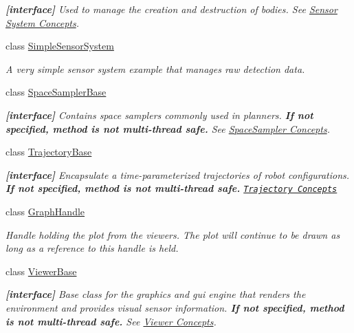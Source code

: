 \begin{DoxyCompactItemize}
\begin{DoxyCompactList}\small\item\em {\bfseries \mbox{[}interface\mbox{]}} Used to manage the creation and destruction of bodies. See \hyperlink{arch__sensorsystem}{Sensor System Concepts}. \item\end{DoxyCompactList}\item 
class \hyperlink{classOpenRAVE_1_1SimpleSensorSystem}{SimpleSensorSystem}
\begin{DoxyCompactList}\small\item\em A very simple sensor system example that manages raw detection data. \item\end{DoxyCompactList}\item 
class \hyperlink{classOpenRAVE_1_1SpaceSamplerBase}{SpaceSamplerBase}
\begin{DoxyCompactList}\small\item\em {\bfseries \mbox{[}interface\mbox{]}} Contains space samplers commonly used in planners. {\bfseries If not specified, method is not multi-\/thread safe.} See \hyperlink{arch__spacesampler}{SpaceSampler Concepts}. \item\end{DoxyCompactList}\item 
class \hyperlink{classOpenRAVE_1_1TrajectoryBase}{TrajectoryBase}
\begin{DoxyCompactList}\small\item\em {\bfseries \mbox{[}interface\mbox{]}} Encapsulate a time-\/parameterized trajectories of robot configurations. {\bfseries If not specified, method is not multi-\/thread safe.} \href{../main/architecture/trajectory.html}{\tt Trajectory Concepts} \item\end{DoxyCompactList}\item 
class \hyperlink{classOpenRAVE_1_1GraphHandle}{GraphHandle}
\begin{DoxyCompactList}\small\item\em Handle holding the plot from the viewers. The plot will continue to be drawn as long as a reference to this handle is held. \item\end{DoxyCompactList}\item 
class \hyperlink{classOpenRAVE_1_1ViewerBase}{ViewerBase}
\begin{DoxyCompactList}\small\item\em {\bfseries \mbox{[}interface\mbox{]}} Base class for the graphics and gui engine that renders the environment and provides visual sensor information. {\bfseries If not specified, method is not multi-\/thread safe.} See \hyperlink{arch__viewer}{Viewer Concepts}. \item\end{DoxyCompactList}\end{DoxyCompactItemize}
